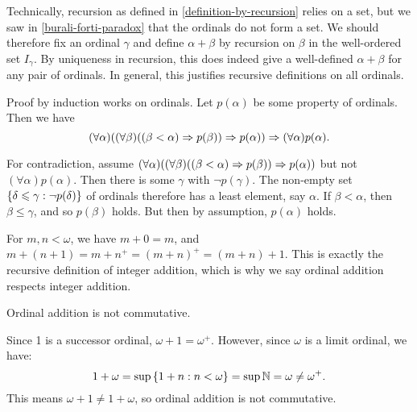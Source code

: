 \documentclass{article}
\begin{document}
\begin{note}
	Technically, recursion as defined in \ref{definition-by-recursion} relies on a set, but we saw in \ref{burali-forti-paradox} that the ordinals do not form a set. We should therefore fix an ordinal $\gamma$ and define $\alpha + \beta$ by recursion on $\beta$ in the well-ordered set $I_\gamma$. By uniqueness in recursion, this does indeed give a well-defined $\alpha + \beta$ for any pair of ordinals. In general, this justifies recursive definitions on all ordinals.
\end{note}

\begin{proposition}
    Proof by induction works on ordinals. Let $p(\alpha)$ be some property of ordinals. Then we have
    \[
	(\forall \alpha) ((\forall \beta)((\beta < \alpha) \Rightarrow p(\beta)) \Rightarrow p(\alpha)) \Rightarrow (\forall \alpha) p(\alpha).
	\]
\end{proposition}

\begin{prf}
    For contradiction, assume $(\forall \alpha) ((\forall \beta)((\beta < \alpha) \Rightarrow p(\beta)) \Rightarrow p(\alpha))$ but not $(\forall \alpha) p(\alpha)$. Then there is some $\gamma$ with $\lnot p(\gamma)$. The non-empty set $\left\lbrace \delta \leqslant \gamma : \lnot p(\delta) \right\rbrace$ of ordinals therefore has a least element, say $\alpha$. If $\beta < \alpha$, then $\beta \leq \gamma$, and so $p(\beta)$ holds. But then by assumption, $p(\alpha)$ holds.
\end{prf}

\begin{note}
	For $m, n < \omega$, we have $m + 0 = m$, and $m + (n+1) = m + n^+ = (m+n)^+ = (m+n)+1$. This is exactly the recursive definition of integer addition, which is why we say ordinal addition respects integer addition.
\end{note}

\begin{proposition}[Noncommutativity]
    Ordinal addition is not commutative.
\end{proposition}

\begin{prf}
    Since 1 is a successor ordinal, $\omega + 1 = \omega^+$. However, since $\omega$ is a limit ordinal, we have:
    \[
	1 + \omega = \sup\left\lbrace 1 + n : n < \omega \right\rbrace = \sup \mathbb{N} = \omega \neq \omega^+.
	\]
	This means $\omega + 1 \neq 1 + \omega$, so ordinal addition is not commutative.
\end{prf}
\end{document}
